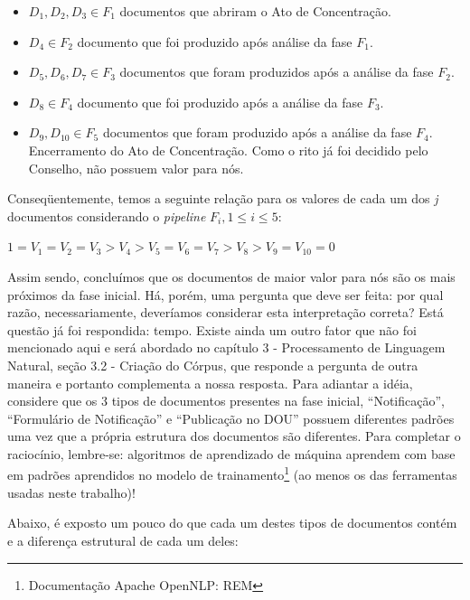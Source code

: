 \documentclass[11pt]{report}
\newcommand{\quotes}[1]{``#1''}
\begin{document}
\begin{itemize}
  \item $D_1, D_2, D_3 \in F_1$ documentos que abriram o Ato de Concentração.
  \item $D_4 \in F_2$ documento que foi produzido após análise da fase $F_1$.
  \item $D_5, D_6, D_7 \in F_3$ documentos que foram produzidos após a análise da fase $F_2$.
  \item $D_8 \in F_4$ documento que foi produzido após a análise da fase $F_3$.
  \item $D_9, D_{10} \in F_5$ documentos que foram produzido após a análise da fase $F_4$. Encerramento do Ato de Concentração. Como o rito já foi decidido pelo Conselho,
  não possuem valor para nós.
\end{itemize}

Conseqüentemente, temos a seguinte relação para os valores de cada um dos \textit{j} documentos considerando o \textit{pipeline} $F_i, 1 \leq i \leq 5$:
\begin{center}
  $1 = V_1 = V_2 = V_3 > V_4 > V_5 = V_6 = V_7 > V_8 > V_9 = V_{10} = 0$
\end{center}

Assim sendo, concluímos que os documentos de maior valor para nós são os mais próximos da fase inicial. Há, porém, uma pergunta que deve ser feita: por qual razão,
necessariamente, deveríamos considerar esta interpretação correta? Está questão já foi respondida: tempo. Existe ainda um outro fator que não foi mencionado aqui e será abordado
no capítulo 3 - Processamento de Linguagem Natural, seção 3.2 - Criação do Córpus, que responde a pergunta de outra maneira e portanto complementa a nossa resposta. Para adiantar a idéia, considere que os 3 tipos de
documentos presentes na fase inicial, \quotes{Notificação}, \quotes{Formulário de Notificação} e \quotes{Publicação no DOU} possuem diferentes padrões uma vez que a própria
estrutura dos documentos são diferentes. Para completar o raciocínio, lembre-se: algoritmos de aprendizado de máquina aprendem com base em padrões aprendidos no modelo
de trainamento\footnote[6]{Documentação Apache OpenNLP: REM} (ao menos os das ferramentas usadas neste trabalho)!

Abaixo, é exposto um pouco do que cada um destes tipos de documentos contém e a diferença estrutural de cada um deles:
\end{document}
